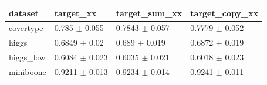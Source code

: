 \begin{tabular}{llll}
\toprule
dataset & target\_xx & target\_sum\_xx & target\_copy\_xx \\
\midrule
covertype & 0.785 $\pm$ 0.055 & 0.7843 $\pm$ 0.057 & 0.7779 $\pm$ 0.052 \\
higgs & 0.6849 $\pm$ 0.02 & 0.689 $\pm$ 0.019 & 0.6872 $\pm$ 0.019 \\
higgs\_low & 0.6084 $\pm$ 0.023 & 0.6035 $\pm$ 0.021 & 0.6018 $\pm$ 0.023 \\
miniboone & 0.9211 $\pm$ 0.013 & 0.9234 $\pm$ 0.014 & 0.9241 $\pm$ 0.011 \\
\bottomrule
\end{tabular}
